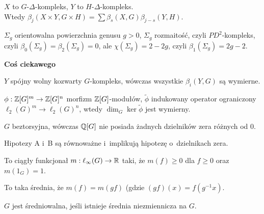 \begin{twierdzenie}
	$X$ to $G$-$\Delta$-kompleks, $Y$ to $H$-$\Delta$-kompleks. \\
	Wtedy ${\beta_j(X \times Y, G \times H)
	= \sum \beta_s(X, G) \beta_{j-s}(Y, H)}$.
\end{twierdzenie}

\begin{przyklad}
	$\Sigma_g$ orientowalna powierzchnia genusu $g>0$,
	$\Sigma_g$ rozmaitość, czyli $PD^2$-kompleks, czyli 
	$\beta_0(\Sigma_g) = \beta_2(\Sigma_g) = 0$,
	ale $\chi(\Sigma_g) = 2 - 2g$, czyli
	$\beta_1(\Sigma_g) = 2g  -2$.
\end{przyklad}

{\bf Coś ciekawego}

\begin{hipoteza}[A]
	$Y$ spójny wolny kozwarty $G$-kompleks, wówczas wszystkie
	$\beta_i(Y, G)$ są wymierne.
\end{hipoteza}

\begin{hipoteza}[B]
	$\phi: {\mathbb{Z}}[G]^m \to {\mathbb{Z}}[G]^n$ morfizm ${\mathbb{Z}}[G]$-modułów,
	$\tilde{\phi}$ indukowany operator ograniczony
	$\ell_2(G)^m \to \ell_2(G)^n$, wtedy
	$\dim_G \ker \tilde{\phi}$ jest wymierny.
\end{hipoteza}

\begin{hipoteza}
	$G$ beztorsyjna, wówczas ${\mathbb{Q}}[G]$ nie posiada żadnych 
	dzielników zera różnych od $0$.
\end{hipoteza}

\begin{fakt}
	Hipotezy A i~B są równoważne i~implikują hipotezę
	o~dzielnikach zera.
\end{fakt}

\begin{definicja}
	To ciągły funkcjonał $m:\ell_\infty(G) \to {\mathbb{R}}$ taki, że
	$m(f) \geq 0$ dla $f \geq 0$ oraz $m(1_G) = 1$.
\end{definicja}

\begin{definicja}
	To taka średnia, że $m(f) = m(gf)$ (gdzie ${(gf)(x) = f(g^{-1}x)}$.
\end{definicja}

\begin{definicja}[średniowalność]
	$G$ jest średniowalna, jeśli istnieje średnia niezmiennicza na $G$.
\end{definicja}

